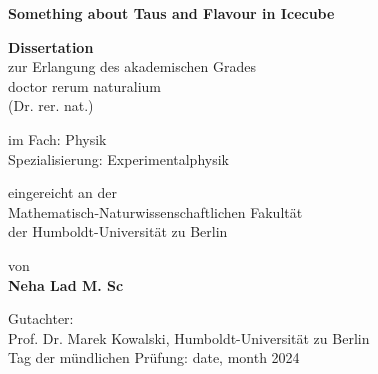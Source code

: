 \documentclass[
	fontsize=10pt, %
	twoside=true, %
	numbers=noenddot,
	secnumdepth=1, %
]{kaobook}
\begin{document}

\begin{titlepage}
	\begin{center}
	\vspace*{0.6cm}
	
	\LARGE
	\textbf{Something about Taus and Flavour in Icecube}
	\large
	
	\vspace{0.8cm}
	
	\textbf{Dissertation}\\
	zur Erlangung des akademischen Grades\\
	doctor rerum naturalium \\ 
	(Dr. rer. nat.) \\
	
	\vspace{0.5cm}
	
	im Fach: Physik \\
	Spezialisierung: Experimentalphysik\\
	
	\vspace{0.5cm}
	
	eingereicht an der \\
	Mathematisch-Naturwissenschaftlichen Fakultät\\	
	der Humboldt-Universität zu Berlin\\
	
	\vspace{0.5cm}
	
	von\\
	\textbf{Neha Lad M. Sc}\\
	
	\vspace{0.5cm}
	 
	\vspace{0.5cm}
	 
	
	\vspace{0.5cm}
	Gutachter:\\
	Prof. Dr. Marek Kowalski, Humboldt-Universität zu Berlin\\
	\vspace{0.5cm}
	Tag der mündlichen Prüfung: date, month 2024
	

\end{center}
\end{titlepage}
\end{document}
